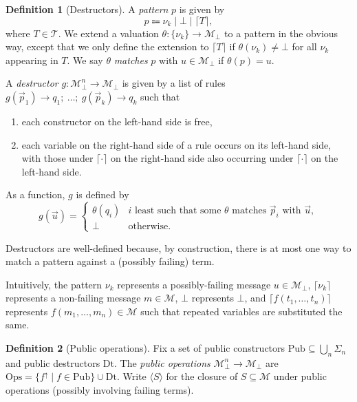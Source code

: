 \documentclass[11pt]{article}
\theoremstyle{definition}
\newtheorem{definition}{Definition}[section]
\theoremstyle{plain}
\theoremstyle{remark}
\newcommand{\Ops}{\mathrm{Ops}}
\newcommand{\Pub}{\mathrm{Pub}}
\newcommand{\Dt}{\mathrm{Dt}}
\begin{document}
\begin{definition}[Destructors]\label{def:destructor}
A \textit{pattern} $p$ is given by
\[p\Coloneqq\nu_k\mid\bot\mid\lceil T\rceil,\]
where $T\in\mathcal{T}$. We extend a valuation $\theta:\{\nu_k\}\to\mathcal{M}_\bot$ to a pattern in the obvious way, except that we only define the extension to $\lceil T\rceil$ if $\theta(\nu_k)\ne\bot$ for all $\nu_k$ appearing in $T$. We say $\theta$ \textit{matches} $p$ with $u\in\mathcal{M}_\bot$ if $\theta(p)=u$.

A \textit{destructor} $g:\mathcal{M}_{\bot}^n\to\mathcal{M}_\bot$ is given by a list of rules $g(\vec p_1)\to q_1;\ \dots;\ g(\vec p_k)\to q_k$ such that
\begin{enumerate}
    \item each constructor on the left-hand side is free,
    \item each variable on the right-hand side of a rule occurs on its left-hand side, with those under $\lceil\cdot\rceil$ on the right-hand side also occurring under $\lceil\cdot\rceil$ on the left-hand side.
\end{enumerate}
As a function, $g$ is defined by
\[
g(\vec u)=\begin{cases}
\theta(q_i) & i \text{ least such that some } \theta \text{ matches } \vec p_i \text{ with } \vec u,\\
\bot & \text{otherwise.}
\end{cases}
\]
\end{definition}

Destructors are well-defined because, by construction, there is at most one way to match a pattern against a (possibly failing) term.

Intuitively, the pattern $\nu_k$ represents a possibly-failing message $u\in\mathcal{M}_\bot$, $\lceil\nu_k\rceil$ represents a non-failing message $m\in\mathcal{M}$, $\bot$ represents $\bot$, and $\lceil f(t_1,\dots,t_n)\rceil$ represents $f(m_1,\dots,m_n)\in\mathcal{M}$ such that repeated variables are substituted the same.

\begin{definition}[Public operations]
Fix a set of public constructors $\Pub\subseteq\bigcup_n\Sigma_n$ and public destructors $\Dt$. The \textit{public operations} $\mathcal{M}_\bot^n\to\mathcal{M}_\bot$ are $\Ops=\{f^{\uparrow}\mid f\in\Pub\}\cup\Dt$. Write $\langle S\rangle$ for the closure of $S\subseteq\mathcal{M}$ under public operations (possibly involving failing terms).
\end{definition}
\end{document}
